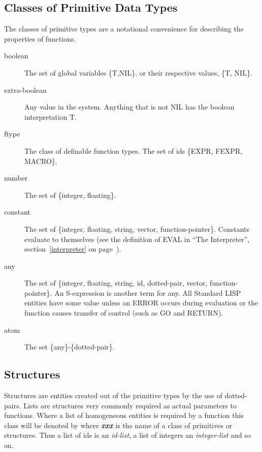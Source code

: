 \documentclass[11pt,letterpaper]{book}
\begin{document}
\subsection{Classes of Primitive Data Types}
\label{pclasses}
The classes of primitive types are a notational convenience for
describing the properties of functions.


\begin{description}
\item[boolean]  The set of global variables \{T,NIL\},
or their respective values, \{T, NIL\}.  

\item[extra-boolean]  Any value in the system.
Anything that is not NIL  has the boolean
interpretation T. 

\item[ftype]  The class of definable function types. The
set of ids \{EXPR, FEXPR, MACRO\}.  

\item[number]  The set of \{integer, floating\}.

\item[constant]  The set of \{integer, floating,
string, vector, function-pointer\}. Constants evaluate to themselves
(see the definition of EVAL in ``The Interpreter'',
section~\ref{interpreter} on page~\pageref{interpreter}). 


\item[any]  The set of \{integer, floating, string, id,
dotted-pair, vector, function-pointer\}. An S-expression is another
term for any. All Standard LISP entities have some value unless an
ERROR occurs during evaluation or the function causes transfer of
control (such as GO and RETURN).


\item[atom]  The set \{any\}-\{dotted-pair\}.
\end{description}

\subsection{Structures}
 
Structures are entities created out of the primitive types by the use
of dotted-pairs. Lists are structures very commonly required as actual
parameters to functions. Where a list of homogeneous entities is
required by a function this class will be denoted by
 where {\bf \em xxx} is the name of a class of primitives
or structures. Thus a list of ids is an {\em id-list}, a list of
integers an {\em integer-list} and so on. 
\end{document}
